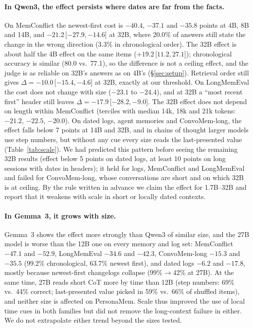 \documentclass[11pt]{article}
\newcommand{\ci}[2]{\,[$#1$,\,$#2$]}
\begin{document}
\paragraph{In Qwen3, the effect persists where dates are far from the facts.}
On MemConflict the newest-first cost is $-40.4$, $-37.1$ and $-35.8$ points at 4B, 8B and 14B, and $-21.2$\ci{-27.9}{-14.6} at 32B, where 20.0\% of answers still state the change in the wrong direction (3.3\% in chronological order). The 32B effect is about half the 4B effect on the same items ($+19.2$\ci{11.2}{27.1}); chronological accuracy is similar (80.0 vs.\ 77.1), so the difference is not a ceiling effect, and the judge is as reliable on 32B's answers as on 4B's (\S\ref{sec:setup}). Retrieval order still gives $\Delta = -10.0$\ci{-15.4}{-4.6} at 32B, exactly at our threshold. On LongMemEval the cost does not change with size ($-23.1$ to $-24.4$), and at 32B a ``most recent first'' header still leaves $\Delta = -17.9$\ci{-28.2}{-9.0}. The 32B effect does not depend on length within MemConflict (terciles with median 14k, 18k and 21k tokens: $-21.2$, $-22.5$, $-20.0$).
On dated logs, agent memories and ConvoMem-long, the effect falls below 7 points at 14B and 32B, and in chains of thought larger models use step numbers, but without any cue every size reads the last-presented value (Table~\ref{tab:scale}). We had predicted this pattern before seeing the remaining 32B results (effect below 5 points on dated logs, at least 10 points on long sessions with dates in headers); it held for logs, MemConflict and LongMemEval and failed for ConvoMem-long, whose conversations are short and on which 32B is at ceiling. By the rule written in advance we claim the effect for 1.7B--32B and report that it weakens with scale in short or locally dated contexts.

\paragraph{In Gemma~3, it grows with size.}
Gemma~3 shows the effect more strongly than Qwen3 of similar size, and the 27B model is worse than the 12B one on every memory and log set: MemConflict $-47.1$ and $-52.9$, LongMemEval $-34.6$ and $-42.3$, ConvoMem-long $-15.3$ and $-35.5$ (99.2\% chronological, 63.7\% newest first), and dated logs $-6.2$ and $-17.8$, mostly because newest-first changelogs collapse (99\%$\rightarrow$42\% at 27B). At the same time, 27B reads short CoT more by time than 12B (step numbers: 69\% vs.\ 44\% correct; last-presented value picked in 59\% vs.\ 66\% of shuffled items), and neither size is affected on PersonaMem. Scale thus improved the use of local time cues in both families but did not remove the long-context failure in either. We do not extrapolate either trend beyond the sizes tested.
\end{document}
